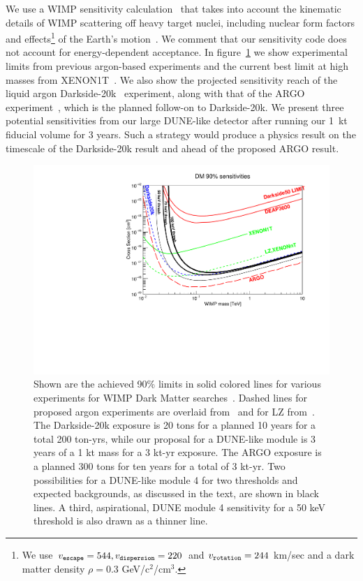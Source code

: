 \documentclass[a4paper,11pt]{article}
\begin{document}
We use a WIMP sensitivity calculation~\cite{loer-code} that takes into account the kinematic details of WIMP scattering off heavy target nuclei, including nuclear form factors and effects\footnote{We use $v_{\tt escape}=544, v_{\tt dispersion}=220$ and $v_{\tt rotation}=244$ km/sec and a dark matter density $\rho=0.3$ GeV/c$^2$/cm$^3$.} of the Earth's motion~\cite{lewinsmith}. We comment that our sensitivity code does not account for energy-dependent acceptance. In figure~\ref{fig:Sensitivity} we show experimental limits from previous argon-based experiments and the current best limit at high masses from XENON1T~\cite{xenon1t}. We also show the projected sensitivity reach of the liquid argon  Darkside-20k~\cite{darkside20k} experiment, along with that of the ARGO experiment~\cite{darkside20k}, which is the planned follow-on to Darkside-20k. We present three potential sensitivities from our large DUNE-like detector after running our 1~kt fiducial volume for 3 years. Such a strategy would produce a physics result on the timescale of the Darkside-20k result and ahead of the proposed ARGO result.


\begin{figure}[t]
\begin{centering}
\includegraphics[width=0.90\columnwidth]{Figures/sens90_100-10-bkd_50pcteff_5cMay2020.pdf}
\par\end{centering}

\caption{Shown are the achieved 90\% limits in solid colored lines for various experiments for WIMP Dark Matter searches~\cite{amaudruz2018first,darkside50,xenon1t}. Dashed lines for proposed argon experiments are overlaid from~\cite{darkside20k} and for LZ from~\cite{LZ}. The Darkside-20k exposure is 20 tons for a planned 10 years for a total 200 ton-yrs, while our proposal for a DUNE-like module is 3 years of a 1 kt mass for a 3 kt-yr exposure. The ARGO exposure is a planned 300 tons for ten years for a total of 3 kt-yr. Two possibilities for a DUNE-like module 4 for two thresholds and expected backgrounds, as discussed in the text, are shown in black lines. A third, aspirational, DUNE module 4 sensitivity for  a 50 keV threshold  is also drawn as a thinner line.   \label{fig:Sensitivity}}
\end{figure}
\end{document}

